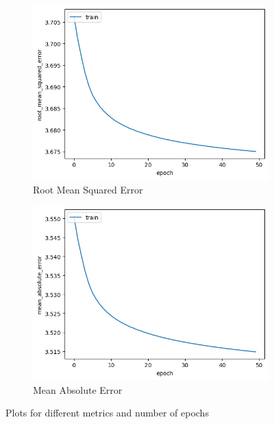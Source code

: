 \documentclass[11pt]{article}
\begin{document}
\begin{figure}[H]
    \centering
    \begin{subfigure}[b]{.45\textwidth}
        \includegraphics[width=\textwidth]{image/rmse.png}
        \caption{Root Mean Squared Error}
    \end{subfigure}
    \hfill
    \begin{subfigure}[b]{.45\textwidth}
        \includegraphics[width=\textwidth]{image/mae.png}
        \caption{Mean Absolute Error}
    \end{subfigure}
    \caption{Plots for different metrics and number of epochs}
  \end{figure}
\end{document}
